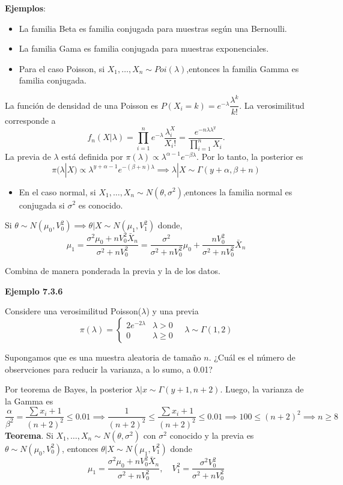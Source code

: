\documentclass[
  12pt,
]{book}
\providecommand{\tightlist}{%
  \setlength{\itemsep}{0pt}\setlength{\parskip}{0pt}}
\begin{document}
\textbf{Ejemplos}:

\begin{itemize}
\item
  La familia Beta es familia conjugada para muestras según una Bernoulli.
\item
  La familia Gama es familia conjugada para muestras exponenciales.
\item
  Para el caso Poisson, si \(X_1,\dots,X_n\sim Poi(\lambda)\),entonces la familia Gamma es familia conjugada.
\end{itemize}

La función de densidad de una Poisson es \(P(X_i = k) = e^{-\lambda}\dfrac{\lambda^k}{k!}\). La verosimilitud corresponde a
\[ f_n(X|\lambda) = \prod_{i=1}^{n}e^{-\lambda}\dfrac{\lambda^X_i}{X_i!} = \dfrac{e^{-n\lambda\lambda^y}}{\prod_{i=1}^n X_i}.\]
La previa de \(\lambda\) está definida por \(\pi(\lambda)\propto\lambda^{\alpha-1}e^{-\beta\lambda}\). Por lo tanto, la posterior es
\[ \pi(\lambda|X) \propto \lambda^{y+\alpha-1}e^{-(\beta+n)\lambda} \implies \lambda|X \sim \Gamma(y+\alpha,\beta+n)\]

\begin{itemize}
\tightlist
\item
  En el caso normal, si \(X_1,\dots,X_n\sim N(\theta,\sigma^2)\),entonces la familia normal es conjugada si \(\sigma^2\) es conocido.
\end{itemize}

Si \(\theta \sim N(\mu_0,V_0^2) \implies \theta|X \sim N(\mu_1, V_1^2)\) donde,
\[\mu_1 = \dfrac{\sigma^2\mu_0 + nV_0^2 \bar X_n}{\sigma^2 + nV_0^2}  = \dfrac{\sigma^2}{\sigma^2 + nV_0^2}\mu_0 + \dfrac{nV_0^2}{\sigma^2 + nV_0^2}\bar X_n\]

Combina de manera ponderada la previa y la de los datos.

\textbf{Ejemplo 7.3.6}

Considere una verosimilitud Poisson(\(\lambda\)) y una previa
\[ \pi(\lambda) = \begin{cases}2e^{-2\lambda} & \lambda> 0 \\ 0 & \lambda \geq 0\end{cases} \quad \lambda \sim \Gamma(1,2)\]

Supongamos que es una muestra aleatoria de tamaño \(n\). ¿Cuál es el número de observciones para reducir la varianza, a lo sumo, a 0.01?

Por teorema de Bayes, la posterior \(\lambda|x \sim \Gamma(y+1,n+2)\). Luego, la varianza de la Gamma es
\[\dfrac{\alpha}{\beta^2} = \dfrac{\sum x_i + 1}{(n+2)^2} \leq 0.01 \implies \dfrac{1}{(n+2)^2} \leq \dfrac{\sum x_i + 1}{(n+2)^2} \leq 0.01 \implies 100 \leq (n+2)^2 \implies n\geq 8\]
\textbf{Teorema}. Si \(X_1,\dots,X_n \sim N(\theta, \sigma^2)\) con \(\sigma^2\) conocido y la previa es \(\theta \sim N(\mu_0,V_0^2)\), entonces \(\theta|X\sim N(\mu_1,V_1^2)\) donde
\[ \mu_1 =  \dfrac{\sigma^2\mu_0 + nV_0^2 \bar X_n}{\sigma^2 + nV_0^2}, \quad V_1^2 = \dfrac{\sigma^2V_0^2}{\sigma^2 + nV_0^2}\]
\end{document}
